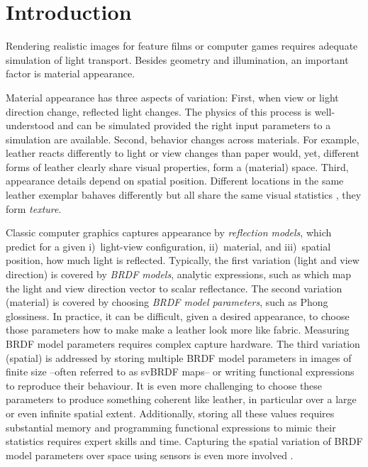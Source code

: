 \documentclass[acmtog, review, anonymous]{acmart}
\begin{document}
\section{Introduction}
Rendering realistic images for feature films or computer games requires adequate simulation of light transport.
Besides geometry and illumination, an important factor is material appearance.

Material appearance has three aspects of variation:
%
First, when view or light direction change, reflected light changes.
The physics of this process is well-understood and can be simulated provided the right input parameters to a simulation are available.
%
Second, behavior changes across materials.
For example, leather reacts differently to light or view changes than paper would, yet, different forms of leather clearly share visual properties, \ie form a (material) space.
%
Third, appearance details depend on spatial position.
Different locations in the same leather exemplar bahaves differently but all share the same visual statistics \cite{portilla2000parametric}, \ie they form \emph{texture}.

Classic computer graphics captures appearance by \emph{reflection models}, which predict for a given i)~light-view configuration, ii)~material, and iii)~spatial position, how much light is reflected.
%
Typically, the first variation (light and view direction) is covered by \emph{BRDF models}, analytic expressions, such as \citet{phong1975illumination} which map the light and view direction vector to scalar reflectance.
%
The second variation (material) is covered by choosing \emph{BRDF model parameters}, such as Phong glossiness.
In practice, it can be difficult, given a desired appearance, to choose those parameters \eg how to make make a leather look more like fabric.
Measuring BRDF model parameters requires complex capture hardware.
%
The third variation (spatial) is addressed by storing multiple BRDF model parameters in images of finite size --often referred to as \ac{svBRDF} maps-- or writing functional expressions to reproduce their behaviour.
It is even more challenging to choose these parameters to produce something coherent like leather, in particular over a large or even infinite spatial extent.
Additionally, storing all these values requires substantial memory and programming functional expressions to mimic their statistics requires expert skills and time.
Capturing the spatial variation of BRDF model parameters over space using sensors is even more involved \cite{BTF}.
\end{document}
